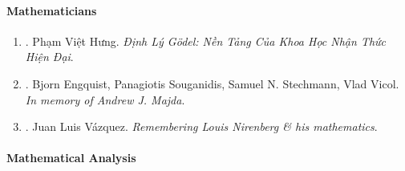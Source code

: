 \documentclass{article}
\begin{document}
\paragraph{Mathematicians}

\begin{enumerate}
	\item \cite{Hung_Godel_thm}. {\sc Phạm Việt Hưng}. {\it Định Lý G\"odel: Nền Tảng Của Khoa Học Nhận Thức Hiện Đại}.\hfill{\sf[done]}
	
	\item \cite{memory_Andrew_Joseph_Majda}. {\sc Bjorn Engquist, Panagiotis Souganidis, Samuel N. Stechmann, Vlad Vicol}. {\it In memory of {\sc Andrew J. Majda}}.\hfill{\sf[reading]}
	
	\item \cite{Vazquez_remember_Nirenberg}. {\sc Juan Luis V\'{a}zquez}. {\it Remembering {\sc Louis Nirenberg} \& his mathematics}.\hfill{\sf[reading]}
\end{enumerate}

\paragraph{Mathematical Analysis}
\end{document}
